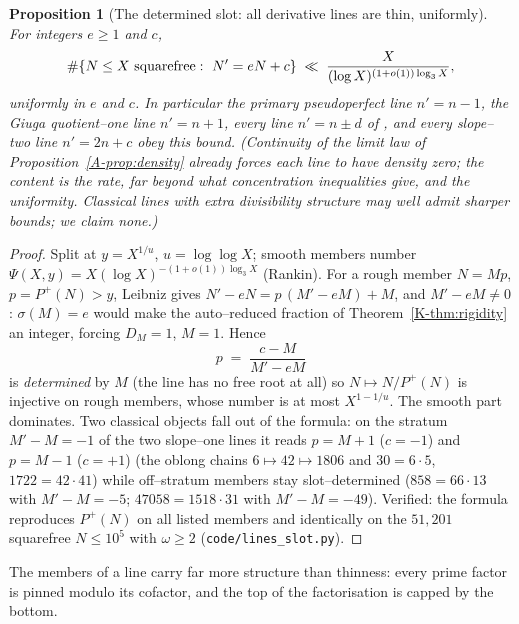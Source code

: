 \documentclass[11pt]{article}
\newtheorem{proposition}[theorem]{Proposition}
\theoremstyle{definition}
\begin{document}
\begin{proposition}[The determined slot: all derivative lines are thin, uniformly]\label{prop:lines}
For integers $e\ge1$ and $c$,
\[ \#\{N\le X\ \textnormal{squarefree}:\ N'=eN+c\}\;\ll\;\frac{X}{(\log X)^{(1+o(1))\log_3X}}, \]
uniformly in $e$ and $c$. In particular the primary pseudoperfect line $n'=n-1$, the Giuga
quotient--one line $n'=n+1$, every line $n'=n\pm d$ of
\cite{GrauOllerMarcenSadornil2021}, and every slope--two line $n'=2n+c$ obey this bound.
(Continuity of the limit law of Proposition~\ref{A-prop:density} already forces each line to have
density zero; the content is the rate, far beyond what concentration inequalities give, and the
uniformity. Classical lines with extra divisibility structure may well admit sharper bounds; we
claim none.)
\end{proposition}
\begin{proof}
Split at $y=X^{1/u}$, $u=\log\log X$; smooth members number
$\Psi(X,y)=X(\log X)^{-(1+o(1))\log_3X}$ (Rankin). For a rough member $N=Mp$, $p=P^+(N)>y$,
Leibniz gives $N'-eN=p\,(M'-eM)+M$, and $M'-eM\ne0$: $\sigma(M)=e$ would make the auto--reduced
fraction of Theorem~\ref{K-thm:rigidity} an integer, forcing $D_M=1$, $M=1$. Hence
\[ p\;=\;\frac{c-M}{M'-eM} \]
is \emph{determined} by $M$ (the line has no free root at all) so $N\mapsto N/P^+(N)$ is
injective on rough members, whose number is at most $X^{1-1/u}$. The smooth part dominates.
Two classical objects fall out of the formula: on the stratum $M'-M=-1$ of the two slope--one
lines it reads $p=M+1$ ($c=-1$) and $p=M-1$ ($c=+1$) (the oblong chains
$6\mapsto42\mapsto1806$ and $30=6\cdot5$, $1722=42\cdot41$) while off--stratum members stay
slot--determined ($858=66\cdot13$ with $M'-M=-5$; $47058=1518\cdot31$ with $M'-M=-49$). Verified:
the formula reproduces $P^+(N)$ on all listed members and identically on the $51{,}201$ squarefree
$N\le10^5$ with $\omega\ge2$ (\texttt{code/lines\_slot.py}).
\end{proof}

The members of a line carry far more structure than thinness: every prime factor is pinned modulo
its cofactor, and the top of the factorisation is capped by the bottom.
\end{document}
